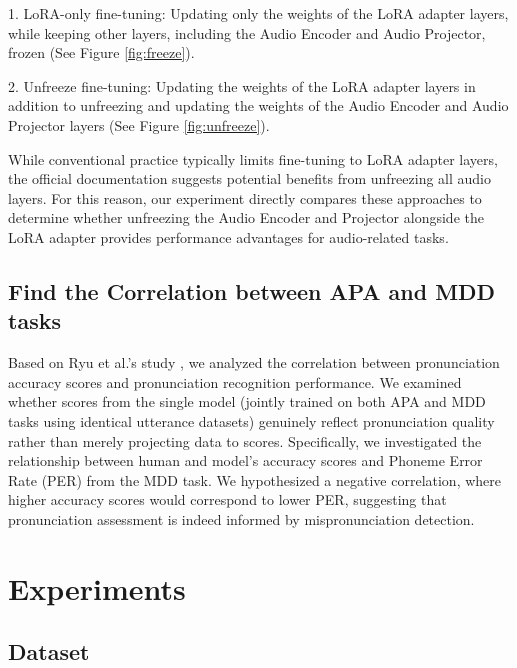 \documentclass[sigconf,nonacm]{acmart}
\begin{document}
1. LoRA-only fine-tuning: Updating only the weights of the LoRA adapter layers, while keeping other layers, including the Audio Encoder and Audio Projector, frozen (See Figure \ref{fig:freeze}).

2. Unfreeze fine-tuning: Updating the weights of the LoRA adapter layers in addition to unfreezing and updating the weights of the Audio Encoder and Audio Projector layers (See Figure \ref{fig:unfreeze}).

While conventional practice typically limits fine-tuning to LoRA adapter layers, the official documentation \cite{microsoft2025phi} suggests potential benefits from unfreezing all audio layers. For this reason, our experiment directly compares these approaches to determine whether unfreezing the Audio Encoder and Projector alongside the LoRA adapter provides performance advantages for audio-related tasks.

\subsection{Find the Correlation between APA and MDD tasks}
Based on Ryu et al.'s study \cite{ryu2023joint}, we analyzed the correlation between pronunciation accuracy scores and  pronunciation recognition performance. We examined whether scores from the single model (jointly trained on both APA and MDD tasks using identical utterance datasets) genuinely reflect pronunciation quality rather than merely projecting data to scores. Specifically, we investigated the relationship between human and model's accuracy scores and Phoneme Error Rate (PER) from the MDD task. We hypothesized a negative correlation, where higher accuracy scores would correspond to lower PER, suggesting that pronunciation assessment is indeed informed by mispronunciation detection.

\section{Experiments}
\subsection{Dataset}
\end{document}
